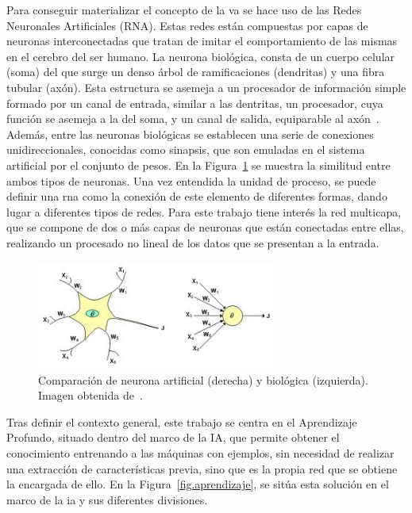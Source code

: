 Para conseguir materializar el concepto de la \acrshort{va} se hace uso de las Redes Neuronales Artificiales (RNA). Estas redes están compuestas por capas de neuronas interconectadas que tratan de imitar el comportamiento de las mismas en el cerebro del ser humano. La neurona biológica, consta de un cuerpo celular (soma) del que surge un denso árbol de ramificaciones (dendritas) y una fibra tubular (axón). Esta estructura se asemeja a un procesador de información simple formado por un canal de entrada, similar a las dentritas, un procesador, cuya función se asemeja a la del soma, y un canal de salida, equiparable al axón~\cite{rna}. Además, entre las neuronas biológicas se establecen una serie de conexiones unidireccionales, conocidas como sinapsis, que son emuladas en el sistema artificial por el conjunto de pesos. En la Figura~\ref{fig.rna} se muestra la similitud entre ambos tipos de neuronas. Una vez entendida la unidad de proceso, se puede definir una \acrshort{rna} como la conexión de este elemento de diferentes formas, dando lugar a diferentes tipos de redes. Para este trabajo tiene interés la red multicapa, que se compone de dos o más capas de neuronas que están conectadas entre ellas, realizando un procesado no lineal de los datos que se presentan a la entrada.\\

\begin{figure}[H]
	\begin{center}
		\includegraphics[width=0.7\textwidth]{figures/rna.jpg}
		\caption{Comparación de neurona artificial (derecha) y biológica (izquierda). Imagen obtenida de~\cite{rna}.}
		\label{fig.rna}
	\end{center}
\end{figure}

Tras definir el contexto general, este trabajo se centra en el Aprendizaje Profundo, situado dentro del marco de la IA, que permite obtener el conocimiento entrenando a las máquinas con ejemplos, sin necesidad de realizar una extracción de características previa, sino que es la propia red que se obtiene la encargada de ello. En la Figura~\ref{fig.aprendizaje}, se sitúa esta solución en el marco de la \acrshort{ia} y sus diferentes divisiones.

